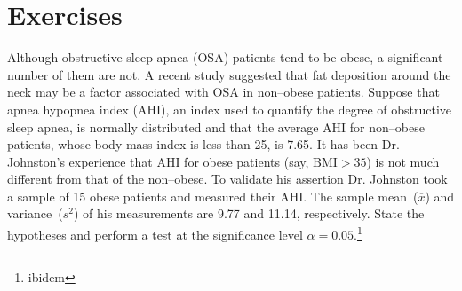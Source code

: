 \section{Exercises}
\label{ch5Exercises}


\begin{problem}  %
  Although obstructive sleep apnea (OSA) patients tend to be obese, a
  significant number of them are not. A recent study suggested that
  fat deposition around the neck may be a factor associated with OSA
  in non--obese patients. Suppose that apnea hypopnea index (AHI), an
  index used to quantify the degree of obstructive sleep apnea, is
  normally distributed and that the average AHI for non--obese
  patients, whose body mass index is less than 25, is 7.65. It has
  been Dr. Johnston’s experience that AHI for obese patients
  (say, $\textrm{BMI} > 35$) is not much different from that of the non--obese. To validate his assertion Dr. Johnston took a sample of 15 obese patients and
measured their AHI. The sample 	mean~($\overline{x}$)	and	variance~($s^2$) of his measurements are 9.77 and 11.14, respectively. State the hypotheses and perform a test at the significance level $\alpha= 0.05$.\footnote{ibidem}
\end{problem}

